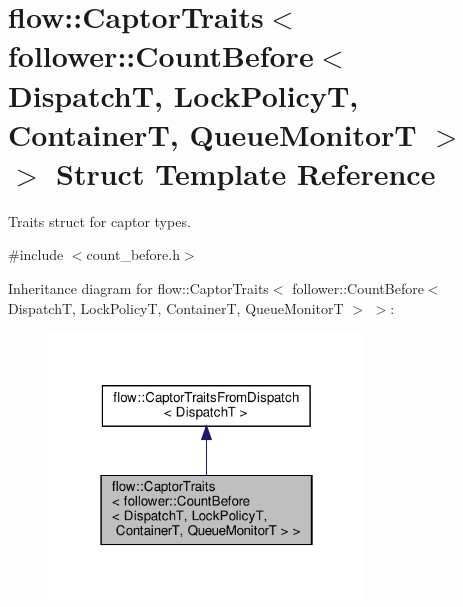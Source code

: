 \hypertarget{structflow_1_1_captor_traits_3_01follower_1_1_count_before_3_01_dispatch_t_00_01_lock_policy_t_0d08c28482191f4a9fdac77c50d53921d}{}\section{flow\+:\+:Captor\+Traits$<$ follower\+:\+:Count\+Before$<$ DispatchT, Lock\+PolicyT, ContainerT, Queue\+MonitorT $>$ $>$ Struct Template Reference}
\label{structflow_1_1_captor_traits_3_01follower_1_1_count_before_3_01_dispatch_t_00_01_lock_policy_t_0d08c28482191f4a9fdac77c50d53921d}


Traits struct for captor types.  




{\ttfamily \#include $<$count\+\_\+before.\+h$>$}



Inheritance diagram for flow\+:\+:Captor\+Traits$<$ follower\+:\+:Count\+Before$<$ DispatchT, Lock\+PolicyT, ContainerT, Queue\+MonitorT $>$ $>$\+:
\nopagebreak
\begin{figure}[H]
\begin{center}
\leavevmode
\includegraphics[width=238pt]{structflow_1_1_captor_traits_3_01follower_1_1_count_before_3_01_dispatch_t_00_01_lock_policy_t_04f3cbc9817388fcf78dbf71649207fe7}
\end{center}
\end{figure}


